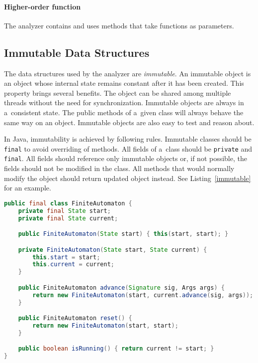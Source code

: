 \paragraph{Higher-order function}
The analyzer contains and uses methods that take functions as parameters.

\subsection{Immutable Data Structures}

The data structures used by the analyzer are \emph{immutable}. An immutable
object is an object whose internal state remains constant after it has been
created.  This property brings several benefits. The object can be shared among
multiple threads without the need for synchronization. Immutable objects are
always in a~consistent state. The public methods of a~given class will always
behave the same way on an object. Immutable objects are also easy to test and
reason about.

In Java, immutability is achieved by following rules. Immutable classes should
be \texttt{final} to avoid overriding of methods. All fields of a~class
should be \texttt{private} and \texttt{final}. All fields should reference only
immutable objects or, if not possible, the fields should not be modified in the
class. All methods that would normally modify the object should return updated
object instead. See Listing~\ref{immutable} for an example.

\begin{lstlisting}[language=java, label=immutable, float=hbt,
caption={Simplified implementation of an immutable finite automaton. The
automaton consists of references to the starting state and the current state.
The public constructor allows creating automatons that are in their starting
states, ensuring consistency. The advance method does not update the current
state but creates a~new finite automaton with an updated current state.}]
public final class FiniteAutomaton {
    private final State start;
    private final State current;

    public FiniteAutomaton(State start) { this(start, start); }

    private FiniteAutomaton(State start, State current) {
        this.start = start;
        this.current = current;
    }

    public FiniteAutomaton advance(Signature sig, Args args) {
        return new FiniteAutomaton(start, current.advance(sig, args));
    }

    public FiniteAutomaton reset() {
        return new FiniteAutomaton(start, start);
    }

    public boolean isRunning() { return current != start; }
}
\end{lstlisting}

